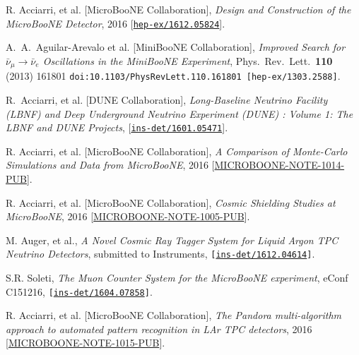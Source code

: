 \documentclass[a4paper,11pt]{article}
\begin{document}
\clearpage{}


\begin{thebibliography}{99}
   R. Acciarri, et al. [MicroBooNE Collaboration], \textit{Design and Construction of the MicroBooNE Detector}, 2016  [\href{https://arxiv.org/abs/1612.05824}{\texttt{hep-ex/1612.05824}}].

   A.~A.~Aguilar-Arevalo et al. [MiniBooNE Collaboration], \textit{Improved Search for $\bar \nu_\mu \rightarrow \bar \nu_e$ Oscillations in the MiniBooNE Experiment}, Phys.\ Rev.\ Lett.\  {\bf 110} (2013) 161801 \texttt{doi:10.1103/PhysRevLett.110.161801 [hep-ex/1303.2588]}.

   R.~Acciarri, et al. [DUNE Collaboration], \textit{Long-Baseline Neutrino Facility (LBNF) and Deep Underground Neutrino Experiment (DUNE) : Volume 1: The LBNF and DUNE Projects}, [\href{https://arxiv.org/abs/1601.05471}{\texttt{ins-det/1601.05471}}].

   R. Acciarri, et al. [MicroBooNE Collaboration], \textit{A Comparison of Monte-Carlo Simulations and Data from MicroBooNE}, 2016 [\href{http://www-microboone.fnal.gov/publications/publicnotes/index.html}{MICROBOONE-NOTE-1014-PUB}].

   R. Acciarri, et al. [MicroBooNE Collaboration], \textit{Cosmic Shielding Studies at MicroBooNE}, 2016 [\href{http://www-microboone.fnal.gov/publications/publicnotes/index.html}{MICROBOONE-NOTE-1005-PUB}].

   M. Auger, et al., \textit{A Novel Cosmic Ray Tagger System for Liquid Argon TPC Neutrino Detectors}, submitted to Instruments, \texttt{[\href{https://arxiv.org/abs/1612.04614}{ins-det/1612.04614}]}.

   S.R. Soleti, \textit{The Muon Counter System for the MicroBooNE experiment}, eConf C151216, \texttt{[\href{https://arxiv.org/abs/1604.07858}{ins-det/1604.07858}]}.

   R. Acciarri, et al. [MicroBooNE Collaboration], \textit{The Pandora multi-algorithm approach to automated pattern recognition in LAr TPC detectors}, 2016  [\href{http://www-microboone.fnal.gov/publications/publicnotes/index.html}{MICROBOONE-NOTE-1015-PUB}].



\end{thebibliography}
\end{document}
